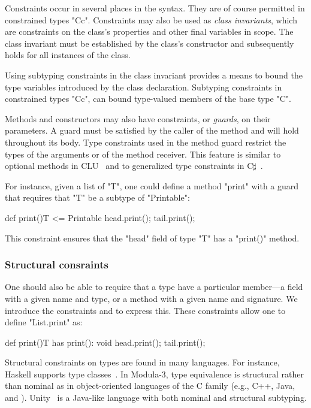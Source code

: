Constraints occur in several places in the \Xten syntax.  They
are of course permitted in constrained types \xcd"C{c}".
Constraints may also be used as \emph{class invariants}, 
which are constraints on the class's properties and other
final variables in scope.
The class invariant must be established by the class's
constructor and subsequently holds for all instances of the
class.

Using subtyping constraints in the class invariant provides a
means to bound the type variables introduced by the class
declaration.  Subtyping constraints in constrained types
\xcd"C{c}", can bound
type-valued members of the base type \xcd"C".

Methods and constructors
may also have constraints, or \emph{guards}, on their parameters.
A guard must be satisfied by the caller of the method and
will hold throughout its body.  Type constraints used in the
method guard restrict the types of the arguments or of the method
receiver.  
This feature is similar to optional methods in CLU~\cite{clu} and to generalized type constraints in C$\sharp$~\cite{emir06}.

For instance, given a list of \xcd"T", one could define a
method \xcd"print" with a guard that requires that \xcd"T" be a
subtype of \xcd"Printable":
\begin{xtenmathnoindent}
  def print(){T <= Printable} {
    head.print();
    tail.print();
  }
\end{xtenmathnoindent}
This constraint ensures that the \xcd"head" field of type
\xcd"T" has a \xcd"print()" method.

\subsubsection{Structural consraints}

One should also
be able to require that a type have a
particular member---a field with a given name and type, or a method
with a given name and signature.
We introduce the constraints 
   and  
 to express this.
These
constraints allow one to define \xcd"List.print" as:
\begin{xtenmathnoindent}
  def print(){T has print(): void} {
    head.print();
    tail.print();
  }
\end{xtenmathnoindent}

Structural constraints on types are found in many languages.
For instance,
Haskell supports type
classes~\cite{haskell,haskell-type-classes}.
%
In Modula-3, type equivalence is structural
rather than nominal as in object-oriented languages of the C
family (e.g., C++, Java, and \Xten{}).
Unity~\cite{malayeriIntegrating08}
is a Java-like language with both nominal and structural subtyping.

